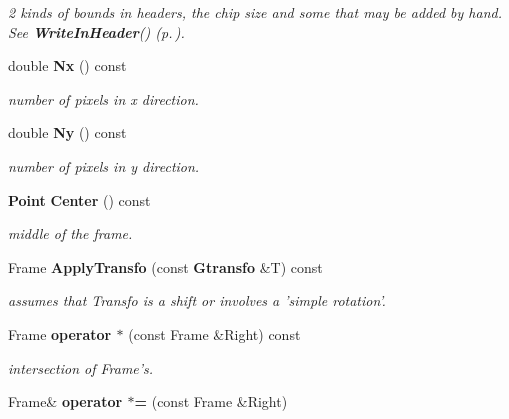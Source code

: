 \begin{CompactItemize}
\begin{CompactList}\small\item\em 2 kinds of bounds in headers, the chip size and some that may be added by hand. See {\bf Write\-In\-Header}() {\rm (p.\,\pageref{class_frame_a22})}.\item\end{CompactList}\item 
{}
double {\bf Nx} () const\label{class_frame_a5}

\begin{CompactList}\small\item\em number of pixels in x direction.\item\end{CompactList}\item 
{}
double {\bf Ny} () const\label{class_frame_a6}

\begin{CompactList}\small\item\em number of pixels in y direction.\item\end{CompactList}\item 
{}
{\bf Point} {\bf Center} () const\label{class_frame_a7}

\begin{CompactList}\small\item\em middle of the frame.\item\end{CompactList}\item 
{}
Frame {\bf Apply\-Transfo} (const {\bf Gtransfo} \&T) const\label{class_frame_a8}

\begin{CompactList}\small\item\em assumes that Transfo is a shift or involves a 'simple rotation'.\item\end{CompactList}\item 
{}
Frame {\bf operator $\ast$} (const Frame \&Right) const\label{class_frame_a9}

\begin{CompactList}\small\item\em intersection of Frame's.\item\end{CompactList}\item 
{}
Frame\& {\bf operator $\ast$=} (const Frame \&Right)\label{class_frame_a10}


\end{CompactItemize}
